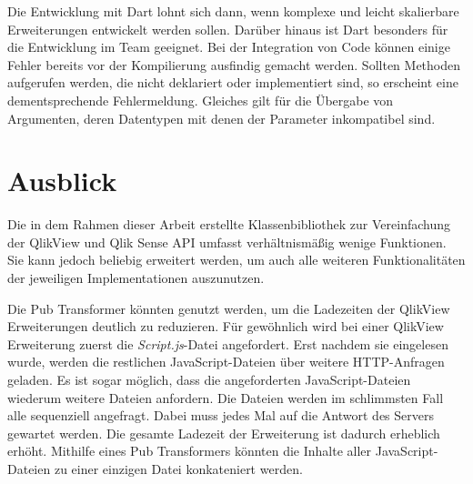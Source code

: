 Die Entwicklung mit Dart lohnt sich dann, wenn komplexe und leicht skalierbare Erweiterungen entwickelt werden sollen. Darüber hinaus ist Dart besonders für die Entwicklung im Team geeignet. Bei der Integration von Code können einige Fehler bereits vor der Kompilierung ausfindig gemacht werden. Sollten Methoden aufgerufen werden, die nicht deklariert oder implementiert sind, so erscheint eine dementsprechende Fehler\-meldung. Gleiches gilt für die Übergabe von Argumenten, deren Daten\-typen mit denen der Parameter inkompatibel sind.



\section{Ausblick}
\label{lab:Ausblick}

Die in dem Rahmen dieser Arbeit erstellte Klassen\-bibliothek zur Vereinfachung der QlikView und Qlik Sense API umfasst verhältnismäßig wenige Funktionen. Sie kann jedoch beliebig erweitert werden, um auch alle weiteren Funktionalitäten der jeweiligen Implementationen auszunutzen.

Die Pub Transformer könnten genutzt werden, um die Ladezeiten der QlikView Erweiterungen deutlich zu reduzieren. Für gewöhnlich wird bei einer QlikView Erweiterung zuerst die \textit{Script.js}-Datei angefordert. Erst nachdem sie eingelesen wurde, werden die restlichen JavaScript-Dateien über weitere HTTP-Anfragen geladen. Es ist sogar möglich, dass die angeforderten JavaScript-Dateien wiederum weitere Dateien anfordern. Die Dateien werden im schlimmsten Fall alle sequenziell angefragt. Dabei muss jedes Mal auf die Antwort des Servers gewartet werden. Die gesamte Ladezeit der Erweiterung ist dadurch erheblich erhöht. Mithilfe eines Pub Transformers könnten die Inhalte aller JavaScript-Dateien zu einer einzigen Datei konkateniert werden.


